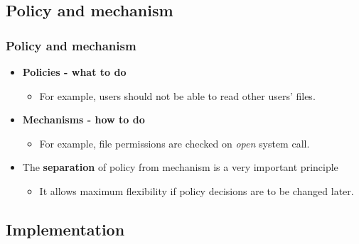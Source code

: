 \documentclass[CJKutf8,xcolor=pdftex,dvipsnames,table]{beamer}
\begin{document}
\begin{CJK*}{UTF8}{song}
  \subsection{Policy and mechanism}

  \begin{frame}
    \frametitle{Policy and mechanism} \pause
    \begin{itemize}
    \item{\textbf{Policies \pause - what to do}} \pause
      \begin{itemize}
      \item{For example, users should not be able to read other users' files.} \pause
      \end{itemize}
    \item{\textbf{Mechanisms \pause - how to do}} \pause
      \begin{itemize}
      \item{For example, file permissions are checked on \emph{open} system call.} \pause
      \end{itemize}
    \item{The \textbf{separation} of policy from mechanism is a very important principle} \pause
      \begin{itemize}
      \item{It allows maximum flexibility if policy decisions are to be changed later.} \pause
      \end{itemize}
    \end{itemize}
  \end{frame}

  \subsection{Implementation}
  

\end{CJK*}
\end{document}
